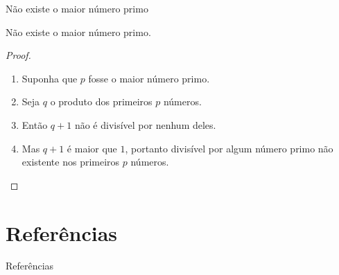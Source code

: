 \documentclass{beamer}
\begin{document}
\begin{frame}{Não existe o maior número primo}
  \begin{theorem}
    Não existe o maior número primo.
  \end{theorem}
  \begin{proof}
    \begin{enumerate}
      \item Suponha que $p$ fosse o maior número primo.
      \item Seja $q$ o produto dos primeiros $p$ números.
      \item Então $q + 1$ não é divisível por nenhum deles.
      \item Mas $q + 1$ é maior que $1$, portanto divisível por algum número primo não existente nos primeiros $p$ números.\qedhere
    \end{enumerate}
  \end{proof}
\end{frame}

\section{Referências}

\begin{frame}[allowframebreaks]{Referências}
  
\end{frame}
\end{document}
